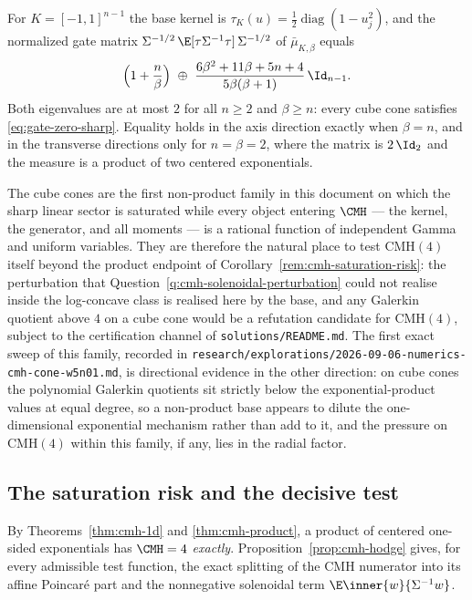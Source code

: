 \documentclass[../../main.tex]{subfiles}
\begin{document}
\begin{corollary}
\label{cor:cube-cone-gate-zero}
For $K=[-1,1]^{n-1}$ the base kernel is $\tau_K(u)=\tfrac12\operatorname{diag}(1-u_j^2)$, and
the normalized gate matrix $\Sigma^{-1/2}\,\E[\tau\Sigma^{-1}\tau]\,\Sigma^{-1/2}$ of
$\bar\mu_{K,\beta}$ equals
\[
  \Bigl(1+\frac n\beta\Bigr)\ \oplus\ \frac{6\beta^2+11\beta+5n+4}{5\beta(\beta+1)}\,\Id_{n-1}.
\]
Both eigenvalues are at most $2$ for all $n\ge2$ and $\beta\ge n$: every cube cone satisfies
\eqref{eq:gate-zero-sharp}. Equality holds in the axis direction exactly when $\beta=n$, and
in the transverse directions only for $n=\beta=2$, where the matrix is $2\,\Id_2$ and the
measure is a product of two centered exponentials.
\end{corollary}

The cube cones are the first non-product family in this document on which the sharp linear
sector is saturated while every object entering $\CMH$ --- the kernel, the generator, and all
moments --- is a rational function of independent Gamma and uniform variables. They are
therefore the natural place to test $\mathrm{CMH}(4)$ itself beyond the product endpoint of
Corollary~\ref{rem:cmh-saturation-risk}: the perturbation that
Question~\ref{q:cmh-solenoidal-perturbation} could not realise inside the log-concave class is
realised here by the base, and any Galerkin quotient above $4$ on a cube cone would be a
refutation candidate for $\mathrm{CMH}(4)$, subject to the certification channel of
\texttt{solutions/README.md}. The first exact sweep of this family, recorded in
\texttt{research/explorations/2026-09-06-numerics-cmh-cone-w5n01.md}, is directional
evidence in the other direction: on cube cones the polynomial Galerkin quotients sit strictly
below the exponential-product values at equal degree, so a non-product base appears to dilute
the one-dimensional exponential mechanism rather than add to it, and the pressure on
$\mathrm{CMH}(4)$ within this family, if any, lies in the radial factor.

\subsection{The saturation risk and the decisive test}
\label{subsec:cmh-saturation}

\begin{corollary}
\label{rem:cmh-saturation-risk}
By Theorems~\ref{thm:cmh-1d} and \ref{thm:cmh-product}, a product of centered one-sided
exponentials has $\CMH=4$ \emph{exactly}. Proposition~\ref{prop:cmh-hodge} gives, for every
admissible test function, the exact splitting of the CMH numerator into its affine Poincar\'e
part and the nonnegative solenoidal term $\E\inner{w}{\Sigma^{-1}w}$.
\end{corollary}
\end{document}
